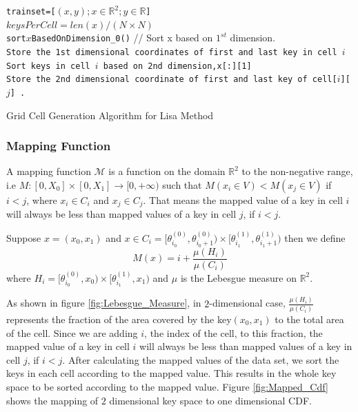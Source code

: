 \begin{algorithm}[H]
    \SetAlgoLined
     \texttt{trainset=[$(x,y);x \in \mathbb{R}^{2};y \in \mathbb{R}$]} \\
     \texttt{$keysPerCell =  len(x) \slash (N \times N) $}\\
     \texttt{sort$x$BasedOnDimension\_0()} // Sort x based on $1^{st}$ dimension. \\
     {
        \texttt{Store the 1st dimensional coordinates of first and last key in cell $i$} \\
        \texttt{Sort keys in cell $i$ based on 2nd dimension,x[:][1] }\\
     }
      {
         {
            \texttt{Store the 2nd dimensional coordinate of first and last key of cell[$i$][$j$] .} \\
		 }
      }
     \caption{Grid Cell Generation Algorithm for Lisa Method}
     \label{Training_Lisa_Baseline}
\end{algorithm}

\subsubsection{Mapping Function}
\label{sssec:Mapping_Function}
A mapping function $\mathcal{M}$ is a function on the domain $\mathbb{R}^{2}$ to the non-negative range, i.e $M:[0,X_{0}]\times[0,X_{1}]\to [0,+\infty)$ such that
    $ M(x_{i} \in V) <  M(x_{j} \in V)$ if $i<j$, where $x_{i} \in C_{i}$ and $x_{j} \in C_{j}$. That means the mapped value of a key in cell $i$ will always be less than mapped values of a key in cell $j$, if $i <j$. 
    
Suppose $x = (x_{0}, x_{1})$ and $x \in C_{i} = [\theta^{(0)}_{i_0},\theta^{(0)}_{i_0+1}) \times [\theta^{(1)}_{i_1},\theta^{(1)}_{i_1+1}) $ then we define 
$$M(x) = i+ \frac {\mu(H_{i})}{\mu(C_{i})} $$ where $H_{i} = [\theta^{(0)}_{i_0},x_{0}) \times [\theta^{(1)}_{i_1},x_{1}) $ and $\mu$ is the Lebesgue measure on $\mathbb{R}^2$.

As shown in figure \ref{fig:Lebesgue_Measure}, in $2$-dimensional case, $\frac {\mu(H_{i})}{\mu(C_{i})}$ represents the fraction of the area covered by the key$(x_{0}, x_{1})$ to the total area of the cell. Since we are adding $i$, the index of the cell, to this fraction, the mapped value of a key in cell $i$ will always be less than mapped values of a key in cell $j$, if $i<j$. After calculating the mapped values of the data set, we sort the keys in each cell according to the mapped value. This results in the whole key space to be sorted according to the mapped value. Figure \ref{fig:Mapped_Cdf} shows the mapping of $2$ dimensional key space to one dimensional CDF.

